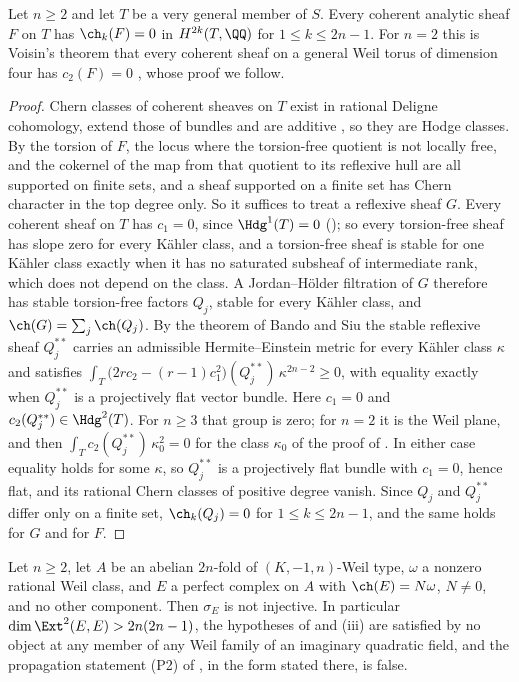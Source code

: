\begin{proposition}
\label{prop:weiltorussheaves}
Let $n\ge2$ and let $T$ be a very general member of $S$. Every coherent
analytic sheaf $F$ on $T$ has $\ch_{k}(F)=0$ in $H^{2k}(T,\QQ)$ for
$1\le k\le2n-1$. For $n=2$ this is Voisin's theorem that every coherent sheaf
on a general Weil torus of dimension four has $c_{2}(F)=0$
\cite[Theorem~10]{Voi02b}, whose proof we follow.
\end{proposition}

\begin{proof}
Chern classes of coherent sheaves on $T$ exist in rational Deligne
cohomology, extend those of bundles and are additive \cite{Gri10}, so they
are Hodge classes. By  the torsion of $F$, the locus where the
torsion-free quotient is not locally free, and the cokernel of the map from
that quotient to its reflexive hull are all supported on finite sets, and a
sheaf supported on a finite set has Chern character in the top degree only. So
it suffices to treat a reflexive sheaf $G$. Every coherent sheaf on $T$ has
$c_{1}=0$, since $\Hdg^{1}(T)=0$ (); so every
torsion-free sheaf has slope zero for every K\"ahler class, and a torsion-free
sheaf is stable for one K\"ahler class exactly when it has no saturated
subsheaf of intermediate rank, which does not depend on the class. A
Jordan--H\"older filtration of $G$ therefore has stable torsion-free factors
$Q_{j}$, stable for every K\"ahler class, and $\ch(G)=\sum_{j}\ch(Q_{j})$.
By the theorem of Bando and Siu \cite{BS94} the stable reflexive sheaf
$Q_{j}^{**}$ carries an admissible Hermite--Einstein metric for every K\"ahler
class $\kappa$ and satisfies
$\int_{T}\bigl(2rc_{2}-(r-1)c_{1}^{2}\bigr)(Q_{j}^{**})\,\kappa^{2n-2}\ge0$,
with equality exactly when $Q_{j}^{**}$ is a projectively flat vector bundle.
Here $c_{1}=0$ and $c_{2}(Q_{j}^{**})\in\Hdg^{2}(T)$. For $n\ge3$ that group is
zero; for $n=2$ it is the Weil plane, and then
$\int_{T}c_{2}(Q_{j}^{**})\,\kappa_{0}^{2}=0$ for the class $\kappa_{0}$ of
the proof of . In either case equality holds for
some $\kappa$, so $Q_{j}^{**}$ is a projectively flat bundle with $c_{1}=0$,
hence flat, and its rational Chern classes of positive degree vanish. Since
$Q_{j}$ and $Q_{j}^{**}$ differ only on a finite set, $\ch_{k}(Q_{j})=0$ for
$1\le k\le2n-1$, and the same holds for $G$ and for $F$.
\end{proof}

\begin{theorem}
\label{thm:p2false}
Let $n\ge2$, let $A$ be an abelian $2n$-fold of $(K,-1,n)$-Weil type, $\omega$
a nonzero rational Weil class, and $E$ a perfect complex on $A$ with
$\ch(E)=N\omega$, $N\ne0$, and no other component. Then $\sigma_{E}$ is not
injective. In particular $\dim\Ext^{2}(E,E)>2n(2n-1)$, the hypotheses of
 and (iii) are satisfied by no
object at any member of any Weil family of an imaginary quadratic field, and
the propagation statement \textup{(P2)} of , in the form
stated there, is false.
\end{theorem}

